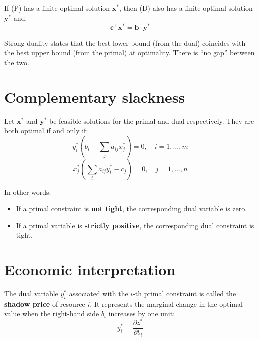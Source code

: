 \begin{theorem}
\label{thm:strong_duality}
If (P) has a finite optimal solution $\mathbf{x}^*$, then (D) also has a
finite optimal solution $\mathbf{y}^*$ and:
\[
  \mathbf{c}^\top \mathbf{x}^* = \mathbf{b}^\top \mathbf{y}^*
\]
\end{theorem}

\begin{intuition}[title=\textbf{Interpretation}]
Strong duality states that the best lower bound (from the dual) coincides
with the best upper bound (from the primal) at optimality.  There is ``no
gap'' between the two.
\end{intuition}

\section{Complementary slackness}

\begin{theorem}
\label{thm:complementary_slackness}
Let $\mathbf{x}^*$ and $\mathbf{y}^*$ be feasible solutions for the primal
and dual respectively.  They are both optimal if and only if:
\[
  y_i^* \left(b_i - \sum_{j} a_{ij} x_j^*\right) = 0, \quad i = 1, \ldots, m
\]
\[
  x_j^* \left(\sum_{i} a_{ij} y_i^* - c_j\right) = 0, \quad j = 1, \ldots, n
\]
\end{theorem}

In other words:
\begin{itemize}
  \item If a primal constraint is \textbf{not tight}, the corresponding dual
        variable is zero.
  \item If a primal variable is \textbf{strictly positive}, the corresponding
        dual constraint is tight.
\end{itemize}

\section{Economic interpretation}

\begin{definition}
The dual variable $y_i^*$ associated with the $i$-th primal constraint is
called the \textbf{shadow price} of resource $i$.  It represents the
marginal change in the optimal value when the right-hand side $b_i$
increases by one unit:
\[
  y_i^* = \frac{\partial z^*}{\partial b_i}
\]
\end{definition}

